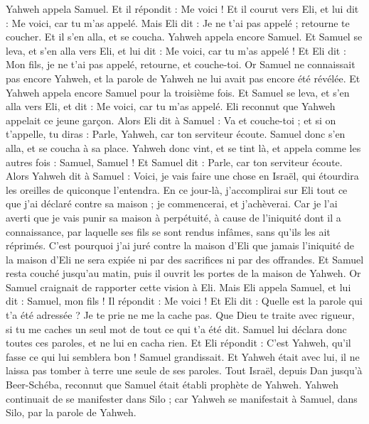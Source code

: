 \begin{multicols}{2}
Yahweh appela Samuel. Et il répondit : Me voici !
Et il courut vers Eli, et lui dit : Me voici, car tu m'as appelé. Mais Eli dit : Je ne t'ai pas appelé ; retourne te coucher. Et il s'en alla, et se coucha.
Yahweh appela encore Samuel. Et Samuel se leva, et s'en alla vers Eli, et lui dit : Me voici, car tu m'as appelé ! Et Eli dit : Mon fils, je ne t'ai pas appelé, retourne, et couche-toi.
Or Samuel ne connaissait pas encore Yahweh, et la parole de Yahweh ne lui avait pas encore été révélée.
Et Yahweh appela encore Samuel pour la troisième fois. Et Samuel se leva, et s'en alla vers Eli, et dit : Me voici, car tu m'as appelé. Eli reconnut que Yahweh appelait ce jeune garçon.
Alors Eli dit à Samuel : Va et couche-toi ; et si on t'appelle, tu diras : Parle, Yahweh, car ton serviteur écoute. Samuel donc s'en alla, et se coucha à sa place.
Yahweh donc vint, et se tint là, et appela comme les autres fois : Samuel, Samuel ! Et Samuel dit : Parle, car ton serviteur écoute.
Alors Yahweh dit à Samuel : Voici, je vais faire une chose en Israël, qui étourdira les oreilles de quiconque l’entendra.
En ce jour-là, j’accomplirai sur Eli tout ce que j’ai déclaré contre sa maison ; je commencerai, et j’achèverai.
Car je l'ai averti que je vais punir sa maison à perpétuité, à cause de l'iniquité dont il a connaissance, par laquelle ses fils se sont rendus infâmes, sans qu’ils les ait réprimés.
C'est pourquoi j'ai juré contre la maison d'Eli que jamais l’iniquité de la maison d'Eli ne sera expiée ni par des sacrifices ni par des offrandes.
Et Samuel resta couché jusqu'au matin, puis il ouvrit les portes de la maison de Yahweh. Or Samuel craignait de rapporter cette vision à Eli.
Mais Eli appela Samuel, et lui dit : Samuel, mon fils ! Il répondit : Me voici !
Et Eli dit : Quelle est la parole qui t'a été adressée ? Je te prie ne me la cache pas. Que Dieu te traite avec rigueur, si tu me caches un seul mot de tout ce qui t'a été dit.
Samuel lui déclara donc toutes ces paroles, et ne lui en cacha rien. Et Eli répondit : C'est Yahweh, qu'il fasse ce qui lui semblera bon !
Samuel grandissait. Et Yahweh était avec lui, il ne laissa pas tomber à terre une seule de ses paroles.
Tout Israël, depuis Dan jusqu'à Beer-Schéba, reconnut que Samuel était établi prophète de Yahweh.
Yahweh continuait de se manifester dans Silo ; car Yahweh se manifestait à Samuel, dans Silo, par la parole de Yahweh.

\end{multicols}
